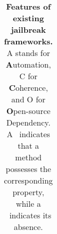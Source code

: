 \begin{table}[h]
\begin{tabular}{>{\centering\arraybackslash}m{5.8cm}|c  c  c}
\end{tabular}
\caption{\textbf{Features of existing jailbreak frameworks.}  A stands for \textbf{A}utomation, C for \textbf{C}oherence, and O for \textbf{O}pen-source Dependency. A \checkmark\ indicates that a method possesses the corresponding property, while a \crossmark\ indicates its absence.}\label{tab:jailbreaks}
\end{table}

